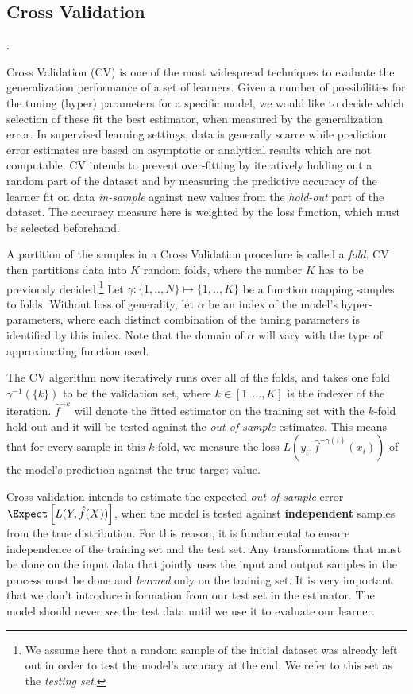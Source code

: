 \subsection{Cross Validation}:  
 
Cross Validation (CV) is one of the most widespread techniques to evaluate the generalization performance of a set of learners. Given a number of possibilities for the tuning (hyper) parameters for a specific model, we would like to decide which selection of these fit the best estimator, when measured by the generalization error. In supervised learning settings, data is generally scarce while prediction error estimates are based on asymptotic or analytical results which are not computable. CV intends to prevent over-fitting by iteratively holding out a random part of the dataset and by measuring the predictive accuracy of the learner fit on data \textit{in-sample} against new values from the \textit{hold-out} part of the dataset. The accuracy measure here is weighted by the loss function, which must be selected beforehand. 
 
 A partition of the samples in a Cross Validation procedure is called a \textit{fold}. CV then partitions data into $K$ random folds, where the number $K$ has to be previously decided.\footnote{ We assume here that a random sample of the initial dataset was already left out in order to test the model's accuracy at the end. We refer to this set as the \textit{testing set}.} Let $\gamma : \{1,..,N\} \mapsto \{1, .., K\}$ be a function mapping samples to folds. Without loss of generality,  let $\alpha$ be an index of the model's hyper-parameters, where each distinct combination of the tuning parameters is identified by this index. Note that the domain of $\alpha$ will vary with the type of approximating function used.
 
 The CV algorithm now iteratively runs over all of the folds, and takes one fold $\gamma^{-1}(\{k\})$ to be the validation set, where $k \in [1,...,K]$ is the indexer of the iteration. $\hat{f}^{-k}$ will denote the fitted estimator on the training set with the $k$-fold hold out and it will be tested against the \textit{out of sample} estimates. This means that for every sample in this $k$-fold, we measure the loss $L(y_i, \hat{f}^{-\gamma(i)}(x_i))$ of the model's prediction against the true target value.
 
 Cross validation intends to estimate the expected \textit{out-of-sample} error $\Expect \left[  L(Y, \hat{f}(X)) \right]$, when the model is tested against \textbf{independent} samples from the true distribution. For this reason, it is fundamental to ensure independence of the training set and the test set. Any transformations that must be done on the input data that jointly uses the input and output samples in the process must be done and \textit{learned} only on the training set. It is very important that we don't introduce information from our test set in the estimator. The model should never \textit{see} the test data until we use it to evaluate our learner. 

